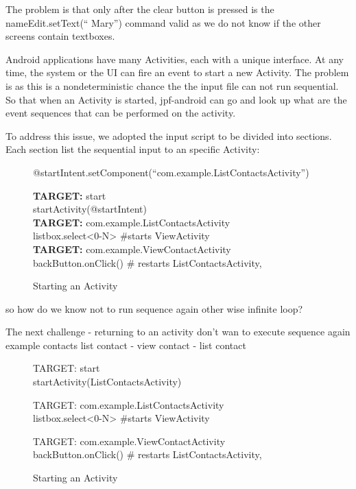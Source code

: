 \documentclass{sig-alternate}
\begin{document}
The problem is that only after the clear button is pressed is the nameEdit.setText(`` Mary'') command valid as we do not know if the other
screens contain textboxes.

Android applications have many Activities, each with a unique interface. At any time, the system or the UI can fire an event to start a new
Activity. The problem is as this is a nondeterministic chance the the input file can not run sequential. So that when an Activity is
started, jpf-android can go and look up what are the event sequences that can be performed on the activity.


To address this issue, we adopted the input script to be divided into sections. Each section list the sequential input to an specific
Activity:




\begin{figure}
{\small
{\sf 
@startIntent.setComponent(``com.example.ListContactsActivity'')

\textbf{TARGET:} start\\
startActivity(@startIntent)\\

\textbf{TARGET:} com.example.ListContactsActivity\\
listbox.select<0-N> \#starts ViewActivity\\

\textbf{TARGET:} com.example.ViewContactActivity\\
backButton.onClick() \# restarts ListContactsActivity, \\
   
}
}
\caption{Starting an Activity}
\end{figure}
so how do we know not to run sequence again other wise infinite loop?




The next challenge 
-  returning to an activity don't wan to execute sequence again example contacts list contact - view contact - list contact

\begin{figure}
{\small
{\sf 
TARGET: start\\
  startActivity(ListContactsActivity)

TARGET: com.example.ListContactsActivity\\
  listbox.select<0-N> \#starts ViewActivity

TARGET: com.example.ViewContactActivity\\
   backButton.onClick() \# restarts ListContactsActivity, 
}
}
\caption{Starting an Activity}
\end{figure}
\end{document}
